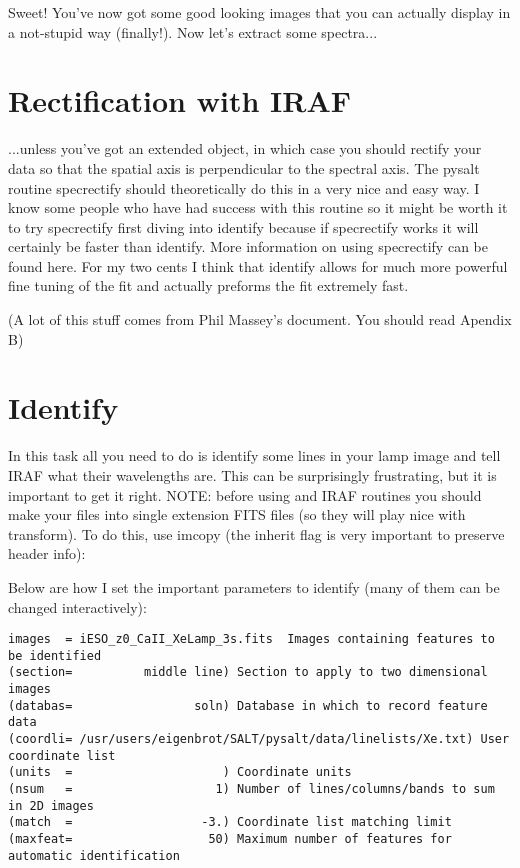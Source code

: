 \documentclass[letter,11pt,oneside]{article}
\newcommand{\dhl}[1]{{\color{verbcolor}{\texttt#1}}}
\begin{document}
Sweet! You've now got some good looking images that you can actually
display in a not-stupid way (finally!). Now let's extract some
spectra...

\section{Rectification with IRAF}

...unless you've got an extended object, in which case you should
rectify your data so that the spatial axis is perpendicular to the
spectral axis. The pysalt routine specrectify should theoretically do
this in a very nice and easy way. I know some people who have had
success with this routine so it might be worth it to try specrectify
first diving into identify because if specrectify works it will
certainly be faster than identify. More information on using
specrectify can be found here. For my two cents I think that identify
allows for much more powerful fine tuning of the fit and actually
preforms the fit extremely fast.


(A lot of this stuff comes from Phil Massey's document. 
You should read Apendix B)

\section{Identify}

In this task all you need to do is identify some lines in your lamp
image and tell IRAF what their wavelengths are. This can be
surprisingly frustrating, but it is important to get it right. NOTE:
before using and IRAF routines you should make your files into single
extension FITS files (so they will play nice with transform). To do
this, use imcopy (the inherit flag is very important to preserve
header info):

\dhl{imcopy mctxgpboP2012021500045.fits[SCI,inherit] ESO\_z0\_MgI.fits}

Below are how I set the important parameters to identify (many of them
can be changed interactively):

\begingroup \fontsize{10pt}{10pt}
\selectfont
\begin{verbatim} 
images  = iESO_z0_CaII_XeLamp_3s.fits  Images containing features to be identified
(section=          middle line) Section to apply to two dimensional images
(databas=                 soln) Database in which to record feature data
(coordli= /usr/users/eigenbrot/SALT/pysalt/data/linelists/Xe.txt) User coordinate list
(units  =                     ) Coordinate units
(nsum   =                    1) Number of lines/columns/bands to sum in 2D images
(match  =                  -3.) Coordinate list matching limit
(maxfeat=                   50) Maximum number of features for automatic identification
\end{verbatim}
\endgroup
\end{document}
